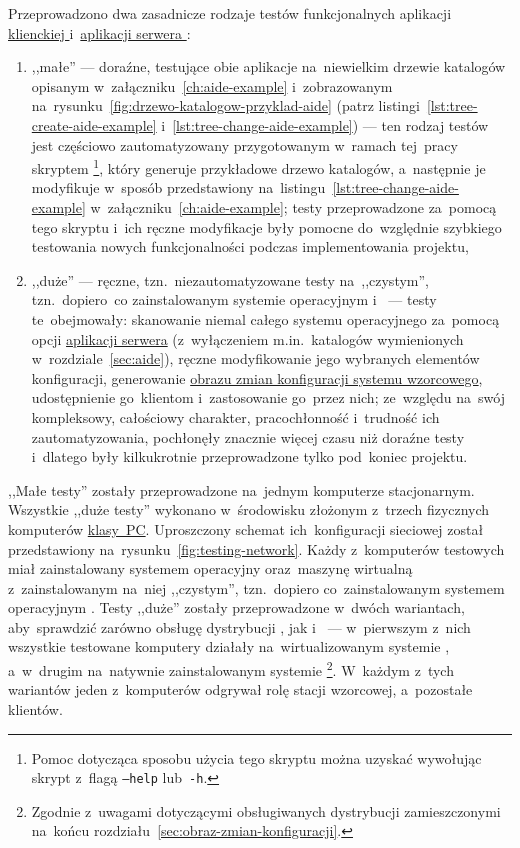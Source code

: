 \documentclass[thesis]{subfiles}
\begin{document}
Przeprowadzono dwa zasadnicze rodzaje testów funkcjonalnych aplikacji \hyperref[sec:cli-app]{klienckiej \texttt{\cliappname{}}} i~\hyperref[sec:srv-app]{aplikacji serwera \texttt{\srvappname{}}}:
\begin{enumerate}
	\item ,,małe'' --- doraźne, testujące obie aplikacje na~niewielkim drzewie katalogów opisanym w~załączniku~\ref{ch:aide-example} i~zobrazowanym na~rysunku~\ref{fig:drzewo-katalogow-przyklad-aide} (patrz listingi~\ref{lst:tree-create-aide-example} i~\ref{lst:tree-change-aide-example}) --- ten rodzaj testów jest częściowo zautomatyzowany przygotowanym w~ramach tej~pracy skryptem \footnote{Pomoc dotycząca sposobu użycia tego skryptu można uzyskać wywołując skrypt z~flagą \texttt{--help} lub~\texttt{-h}.}, który generuje przykładowe drzewo katalogów, a~następnie je modyfikuje w~sposób przedstawiony na~listingu~\ref{lst:tree-change-aide-example} w~załączniku~\ref{ch:aide-example}; testy przeprowadzone za~pomocą tego skryptu i~ich ręczne modyfikacje były pomocne do~względnie szybkiego testowania nowych funkcjonalności podczas implementowania projektu,
	\item ,,duże'' --- ręczne, tzn.~niezautomatyzowane testy na~,,czystym'', tzn.~dopiero~co zainstalowanym systemie operacyjnym  \arch{} i~\debian{} --- testy te~obejmowały: skanowanie niemal całego systemu operacyjnego za~pomocą opcji  \hyperref[sec:srv-app]{aplikacji serwera} (z~wyłączeniem m.in.~katalogów wymienionych w~rozdziale~\ref{sec:aide}), ręczne modyfikowanie jego wybranych elementów konfiguracji, generowanie \hyperref[sec:obraz-zmian-konfiguracji]{obrazu zmian konfiguracji systemu wzorcowego}, udostępnienie go~klientom i~zastosowanie go~przez nich; ze~względu na~swój kompleksowy, całościowy charakter, pracochłonność i~trudność ich zautomatyzowania, pochłonęły znacznie więcej czasu niż doraźne testy i~dlatego były kilkukrotnie przeprowadzone tylko pod~koniec projektu.
\end{enumerate}

,,Małe testy'' zostały przeprowadzone na~jednym komputerze stacjonarnym. Wszystkie ,,duże testy'' wykonano w~środowisku złożonym z~trzech fizycznych komputerów \href{https://en.wikipedia.org/wiki/Personal_computer}{klasy~PC}. Uproszczony schemat ich~konfiguracji sieciowej został przedstawiony na~rysunku~\ref{fig:testing-network}. Każdy z~komputerów testowych miał zainstalowany systemem operacyjny \linuxdebian{} oraz~maszynę wirtualną  z~zainstalowanym na~niej ,,czystym'', tzn.~dopiero co~zainstalowanym systemem operacyjnym \linuxarch{}. Testy ,,duże'' zostały przeprowadzone w~dwóch wariantach, aby~sprawdzić zarówno obsługę dystrybucji \linuxarch{}, jak i~\linuxdebian{} --- w~pierwszym z~nich wszystkie testowane komputery działały na~wirtualizowanym systemie \arch{}, a~w~drugim na~natywnie zainstalowanym systemie \debian{}\footnote{Zgodnie z~uwagami dotyczącymi obsługiwanych dystrybucji  zamieszczonymi na~końcu rozdziału~\ref{sec:obraz-zmian-konfiguracji}.}. W~każdym z~tych wariantów jeden z~komputerów odgrywał rolę stacji wzorcowej, a~pozostałe klientów.
\end{document}
